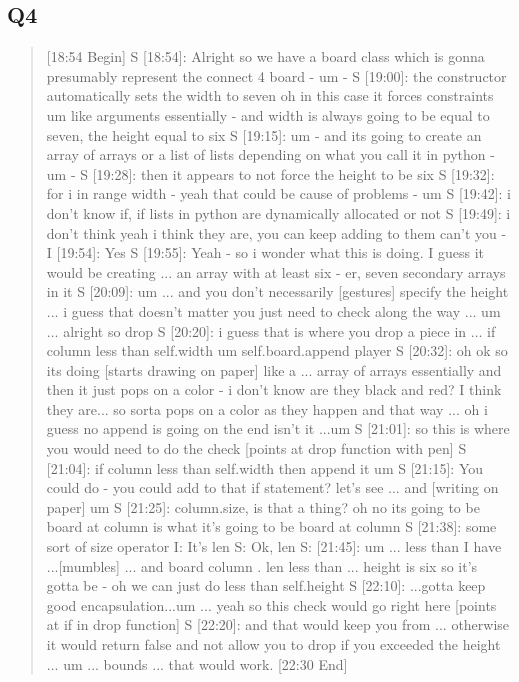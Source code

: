 \subsection{Q4}
\begin{quote}
[18:54 Begin]
S [18:54]: Alright so we have a board class which is gonna presumably represent the connect 4 board - um -
S [19:00]: the constructor automatically sets the width to seven oh in this case it forces constraints um like arguments essentially - and width is always going to be equal to seven, the height equal to six
S [19:15]: um - and its going to create an array of arrays or a list of lists depending on what you call it in python - um -
S [19:28]: then it appears to not force the height to be six 
S [19:32]: for i in range width - yeah that could be cause of problems - um
S [19:42]: i don't know if, if lists in python are dynamically allocated or not
S [19:49]: i don't think yeah i think they are, you can keep adding to them can't you -
I [19:54]: Yes
S [19:55]: Yeah - so i wonder what this is doing. I guess it would be creating ... an array with at least six - er, seven secondary arrays in it
S [20:09]: um ... and you don't necessarily [gestures] specify the height ... i guess that doesn't matter you just need to check along the way ... um ... alright so drop
S [20:20]: i guess that is where you drop a piece in ... if column less than self.width um self.board.append player
S [20:32]: oh ok so its doing  [starts drawing on paper] like a ... array of arrays essentially and then it just pops on a color - i don't know are they black and red? I think they are... so sorta pops on a color as they happen and that way  ... oh i guess no append is going on the end isn't it ...um 
S [21:01]: so this is where you would need to do the check [points at drop function with pen]
S [21:04]: if column less than self.width then append it um 
S [21:15]: You could do - you could add to that if statement? let's see ... and [writing on paper] um 
S [21:25]: column.size, is that a thing? oh no its going to be board at column is what it's going to be board at column
S [21:38]: some sort of size operator
I: It's len
S: Ok, len
S: [21:45]: um ... less than  I have ...[mumbles] ... and board column . len less than ... height is six so it's gotta be - oh we can just do less than self.height
S [22:10]: ...gotta keep good encapsulation...um ... yeah so this check would go right here [points at if in drop function]
S [22:20]: and that would keep you from ... otherwise it would return false and not allow you to drop if you exceeded the height ... um ... bounds ... that would work. 
[22:30 End]
\end{quote}
\newpage